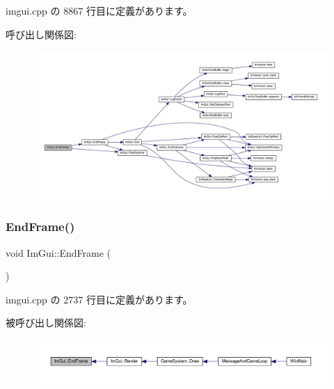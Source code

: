  imgui.\+cpp の 8867 行目に定義があります。

呼び出し関係図\+:\nopagebreak
\begin{figure}[H]
\begin{center}
\leavevmode
\includegraphics[width=350pt]{namespace_im_gui_a63434692d7de278875c7ea0143fbe6e4_cgraph}
\end{center}
\end{figure}
\mbox{\label{namespace_im_gui_a246c37da45e88a12ade440a0feacb4ee}} 
\subsubsection{\texorpdfstring{End\+Frame()}{EndFrame()}}
{\footnotesize\ttfamily void Im\+Gui\+::\+End\+Frame (\begin{DoxyParamCaption}{ }\end{DoxyParamCaption})}



 imgui.\+cpp の 2737 行目に定義があります。

被呼び出し関係図\+:\nopagebreak
\begin{figure}[H]
\begin{center}
\leavevmode
\includegraphics[width=350pt]{namespace_im_gui_a246c37da45e88a12ade440a0feacb4ee_icgraph}
\end{center}
\end{figure}
\mbox{\label{namespace_im_gui_a05fc97fc64f28a55486087f503d9a622}} 
